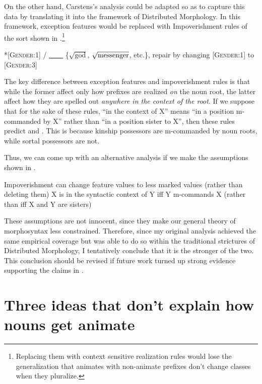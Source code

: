 \documentclass[output=paper
,newtxmath
,modfonts
,nonflat]{langsci/langscibook}
\begin{document}
On the other hand, Carstens's analysis could be adapted so as to capture this data by translating it into the framework of Distributed Morphology.  In this framework, exception features would be replaced with Impoverishment rules of the sort shown in .\footnote{Replacing them with context sensitive realization rules would lose the generalization that animates with non-animate prefixes don't change classes when they pluralize. }

\ea\label{ex:pesetsky:impoverishment}{ 
*[\textsc{Gender}:1] / 
\ul{~~~~} 
\{$\sqrt{\text{god}}$, $\sqrt{\text{messenger\vphantom{d}}}$, etc.\}, 
repair by changing [\textsc{Gender}:1] to [\textsc{Gender}:3]} \z

The key difference between exception features and impoverishment rules is that while the former affect only how  prefixes are realized \textit{on} the noun root, the latter affect how they are spelled out \textit{anywhere in the context of the root}. If we suppose that for the sake of these rules, ``in the context of X'' means ``in a position m-commanded by X'' rather than ``in a position sister to X'', then these rules predict  and .  This is because kinship possessors are m-commanded by noun roots, while sortal possessors are not. 

Thus, we can come up with an alternative analysis if we make the assumptions shown in .

\ea\label{ex:pesetsky:deconstrainingassumptions} 
\ea Impoverishment can change feature values to less marked values (rather than deleting them)
\ex X is in the syntactic context of Y iff Y m-commands X (rather than iff X and Y are sisters) \\ \z \z

These assumptions are not innocent, since they make our general theory of morphosyntax less constrained.  Therefore, since my original analysis achieved the same empirical coverage but was able to do so within the traditional strictures of Distributed Morphology, I tentatively conclude that it is the stronger of the two.  This conclusion should be revised if future work turned up strong evidence supporting the claims in .




 \section{Three ideas that don't explain how nouns get animate} \label{sec:pesetsky:threeideas}
\end{document}
